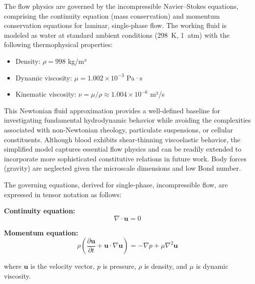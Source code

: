 \documentclass[12pt,a4paper]{article}
\begin{document}
The flow physics are governed by the incompressible Navier--Stokes equations, comprising the continuity equation (mass conservation) and momentum conservation equations for laminar, single-phase flow. The working fluid is modeled as water at standard ambient conditions (298~K, 1~atm) with the following thermophysical properties:
\begin{itemize}
  \item Density: $\rho = 998$ kg/m³
  \item Dynamic viscosity: $\mu = 1.002 \times 10^{-3}$ Pa·s
  \item Kinematic viscosity: $\nu = \mu/\rho \approx 1.004 \times 10^{-6}$ m²/s
\end{itemize}

This Newtonian fluid approximation provides a well-defined baseline for investigating fundamental hydrodynamic behavior while avoiding the complexities associated with non-Newtonian rheology, particulate suspensions, or cellular constituents. Although blood exhibits shear-thinning viscoelastic behavior, the simplified model captures essential flow physics and can be readily extended to incorporate more sophisticated constitutive relations in future work. Body forces (gravity) are neglected given the microscale dimensions and low Bond number.

The governing equations, derived for single-phase, incompressible flow, are expressed in tensor notation as follows:

\textbf{Continuity equation:}
\begin{equation}
\nabla \cdot \mathbf{u} = 0
\end{equation}

\textbf{Momentum equation:}
\begin{equation}
\rho \left( \frac{\partial \mathbf{u}}{\partial t} + \mathbf{u} \cdot \nabla \mathbf{u} \right) = -\nabla p + \mu \nabla^2 \mathbf{u}
\end{equation}

where $\mathbf{u}$ is the velocity vector, $p$ is pressure, $\rho$ is density, and $\mu$ is dynamic viscosity.

\end{document}
